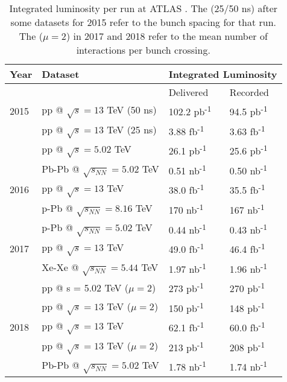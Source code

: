 \begin{table}
\centering
\tiny
\begin{tabular}{|l|l|l|l|}
\hline
Year & Dataset                              & \multicolumn{2}{c|}{Integrated Luminosity}  \\
\hline
     &                                      & Delivered    & Recorded    \\
\hline
2015 & pp @ $\sqrt{s} = 13$ TeV (50 ns)     &  102.2  pb\textsuperscript{-1}   & 94.5  pb\textsuperscript{-1}  \\
     & pp @ $\sqrt{s} = 13$ TeV (25 ns)     &  3.88   fb\textsuperscript{-1}   & 3.63  fb\textsuperscript{-1}  \\
     & pp @ $\sqrt{s} = 5.02$ TeV           &  26.1   pb\textsuperscript{-1}   & 25.6  pb\textsuperscript{-1}  \\
     & Pb-Pb @ $\sqrt{s_{NN}} = 5.02$ TeV   &  0.51   nb\textsuperscript{-1}   &  0.50 nb\textsuperscript{-1}  \\
\hline
2016 & pp @ $\sqrt{s} = 13$ TeV             &  38.0   fb\textsuperscript{-1}   & 35.5  fb\textsuperscript{-1}  \\
     & p-Pb @ $\sqrt{s_{NN}} = 8.16$ TeV    &  170    nb\textsuperscript{-1}   & 167   nb\textsuperscript{-1}  \\
     & p-Pb @ $\sqrt{s_{NN}} = 5.02$ TeV    &  0.44   nb\textsuperscript{-1}   &  0.43 nb\textsuperscript{-1}  \\
\hline
2017 & pp @ $\sqrt{s} = 13$ TeV             &  49.0   fb\textsuperscript{-1}   & 46.4  fb\textsuperscript{-1}  \\
     & Xe-Xe @ $\sqrt{s_{NN}} = 5.44$ TeV   &  1.97   nb\textsuperscript{-1}   &  1.96 nb\textsuperscript{-1}  \\
     & pp @ s = 5.02 TeV ($\mu=2$)          &  273    pb\textsuperscript{-1}   & 270   pb\textsuperscript{-1}  \\
     & pp @ $\sqrt{s} = 13$ TeV ($\mu=2$)   &  150    pb\textsuperscript{-1}   & 148   pb\textsuperscript{-1}  \\
\hline
2018 & pp @ $\sqrt{s} = 13$ TeV             &  62.1   fb\textsuperscript{-1}   & 60.0  fb\textsuperscript{-1}  \\
     & pp @ $\sqrt{s} = 13$ TeV ($\mu=2$)   &  213    pb\textsuperscript{-1}   & 208   pb\textsuperscript{-1}  \\
     & Pb-Pb @ $\sqrt{s_{NN}} = 5.02$ TeV   &  1.78   nb\textsuperscript{-1}   &  1.74 nb\textsuperscript{-1}  \\ 
\hline
\end{tabular}
\caption{
    Integrated luminosity per run at ATLAS \cite{data_quality}.
    The (25/50 ns) after some datasets for 2015 refer to the bunch spacing for that run.
    The ($\mu=2$) in 2017 and 2018 refer to the mean number of interactions per bunch crossing.
}
\label{tab:dataset_lum}

\end{table}
